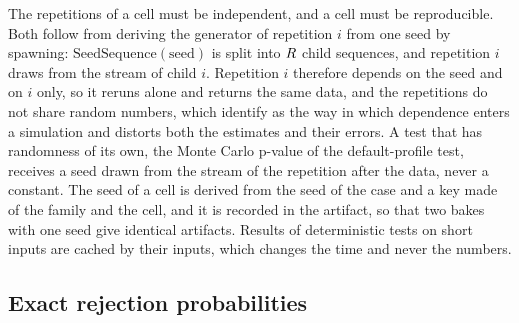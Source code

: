 The repetitions of a cell must be independent, and a cell must be reproducible.
Both follow from deriving the generator of repetition $i$ from one seed by spawning: $\mathrm{SeedSequence}(\mathrm{seed})$ is split into $R$ child sequences, and repetition $i$ draws from the stream of child $i$.
Repetition $i$ therefore depends on the seed and on $i$ only, so it reruns alone and returns the same data, and the repetitions do not share random numbers, which \citet{morris2019} identify as the way in which dependence enters a simulation and distorts both the estimates and their errors.
A test that has randomness of its own, the Monte Carlo p-value of the default-profile test, receives a seed drawn from the stream of the repetition after the data, never a constant.
The seed of a cell is derived from the seed of the case and a key made of the family and the cell, and it is recorded in the artifact, so that two bakes with one seed give identical artifacts.
Results of deterministic tests on short inputs are cached by their inputs, which changes the time and never the numbers.

\subsection{Exact rejection probabilities}
\label{sec:pm-exact}


